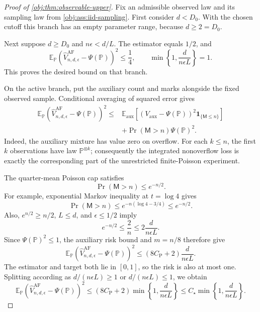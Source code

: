 \begin{proof}[Proof of \cref{obj:thm:observable-upper}]
Fix an admissible observed law and its sampling law from \cref{obj:ass:iid-sampling}. First consider \(d<D_0\). With the chosen cutoff this branch has an empty parameter range, because \(d\ge2=D_0\).

Next suppose \(d\ge D_0\) and \(n\epsilon<d/L\). The estimator equals \(1/2\), and
\[
\mathbb E_{\mathbb P}
\left(\widehat V_{n,d,\epsilon}^{\mathrm{AF}}-\Psi(\mathbb P)\right)^2
\le\frac14,
\qquad
\min\left\{1,\frac{d}{n\epsilon L}\right\}=1.
\]
This proves the desired bound on that branch.

On the active branch, put the auxiliary count and marks alongside the fixed observed sample. Conditional averaging of squared error gives
\[
\begin{aligned}
\mathbb E_{\mathbb P}
\left(\widehat V_{n,d,\epsilon}^{\mathrm{AF}}-\Psi(\mathbb P)\right)^2
\le{}&
\mathbb E_{\mathrm{aux}}
\left[
(V_{\mathrm{aux}}-\Psi(\mathbb P))^2
\mathbf1_{\{\mathsf M\le n\}}
\right]\\
&+\Pr(\mathsf M>n)\Psi(\mathbb P)^2.
\end{aligned}
\]
Indeed, the auxiliary mixture has value zero on overflow. For each \(k\le n\), the first \(k\) observations have law \(\mathbb P^{\otimes k}\); consequently the integrated nonoverflow loss is exactly the corresponding part of the unrestricted finite-Poisson experiment.

The quarter-mean Poisson cap satisfies
\[
\Pr(\mathsf M>n)\le e^{-n/2}.
\]
For example, exponential Markov inequality at \(t=\log4\) gives
\[
\Pr(\mathsf M>n)
\le e^{-n(\log4-3/4)}
\le e^{-n/2}.
\]
Also, \(e^{n/2}\ge n/2\), \(L\le d\), and \(\epsilon\le1/2\) imply
\[
e^{-n/2}\le\frac2n
\le2\frac{d}{n\epsilon L}.
\]
Since \(\Psi(\mathbb P)^2\le1\), the auxiliary risk bound and \(m=n/8\) therefore give
\[
\mathbb E_{\mathbb P}
\left(\widehat V_{n,d,\epsilon}^{\mathrm{AF}}-\Psi(\mathbb P)\right)^2
\le
(8C_{\mathrm P}+2)\frac{d}{n\epsilon L}.
\]
The estimator and target both lie in \([0,1]\), so the risk is also at most one. Splitting according as \(d/(n\epsilon L)\ge1\) or \(d/(n\epsilon L)\le1\), we obtain
\[
\mathbb E_{\mathbb P}
\left(\widehat V_{n,d,\epsilon}^{\mathrm{AF}}-\Psi(\mathbb P)\right)^2
\le
(8C_{\mathrm P}+2)
\min\left\{1,\frac{d}{n\epsilon L}\right\}
\le
C_\star\min\left\{1,\frac{d}{n\epsilon L}\right\}.
\]


\end{proof}
